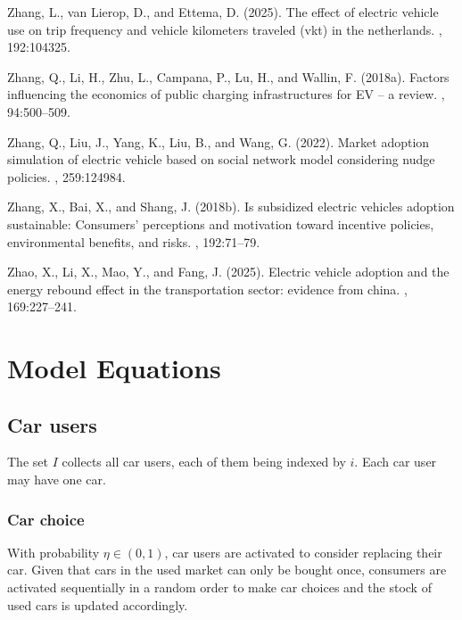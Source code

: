 \documentclass[12pt]{article}
\begin{document}
\begin{thebibliography}{}
Zhang, L., van Lierop, D., and Ettema, D. (2025).
\newblock The effect of electric vehicle use on trip frequency and vehicle
  kilometers traveled (vkt) in the netherlands.
,
  192:104325.

Zhang, Q., Li, H., Zhu, L., Campana, P., Lu, H., and Wallin, F. (2018a).
\newblock Factors influencing the economics of public charging infrastructures
  for {EV} -- a review.
, 94:500--509.

Zhang, Q., Liu, J., Yang, K., Liu, B., and Wang, G. (2022).
\newblock Market adoption simulation of electric vehicle based on social
  network model considering nudge policies.
, 259:124984.

Zhang, X., Bai, X., and Shang, J. (2018b).
\newblock Is subsidized electric vehicles adoption sustainable: Consumers'
  perceptions and motivation toward incentive policies, environmental benefits,
  and risks.
, 192:71--79.

Zhao, X., Li, X., Mao, Y., and Fang, J. (2025).
\newblock Electric vehicle adoption and the energy rebound effect in the
  transportation sector: evidence from china.
, 169:227--241.

\end{thebibliography}


	\appendix

	\section{Model Equations}
	\label{model_equations}

	\subsection{Car users} \label{Model_Users}
	The set $I$ collects all car users, each of them being indexed by $i$. Each car user may have one car.

	\subsubsection{Car choice} \label{Users_Choice}
	With probability $\eta\in(0,1)$, car users are activated to consider replacing their car. Given that cars in the used market can only be bought once, consumers are activated sequentially in a random order to make car choices and the stock of used cars is updated accordingly.
\end{document}
